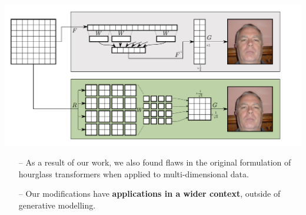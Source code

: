 \documentclass[14pt,margin=0.5in,innermargin=0in,blockverticalspace=-0.1in,colspace=-1.2cm]{tikzposter}
\begin{document}
\begin{columns}
{\begin{tcolorbox}[boxsep=0pt,top=0cm,bottom=0.0cm,adjusted title={\huge\bf Proposed Method},colbacktitle=colorOne]
        \begin{minipage}{0.75\linewidth}
        \begin{tikzfigure}
            \includegraphics[width=\linewidth]{resample.pdf}
        \end{tikzfigure}
        \end{minipage}
        \hspace{-2cm}
        \begin{minipage}{0.25\linewidth}
            \Large
            \vspace{0.5cm}
            \begin{itemize}
                \item[--] As a result of our work, we also found flaws in the
                    original formulation of hourglass transformers when applied
                    to multi-dimensional data.
                \item[--] Our modifications have \textbf{applications in a wider
                    context}, outside of generative modelling.
            \end{itemize}
        \end{minipage}
        \end{tcolorbox}
    }


\end{columns}
\end{document}

